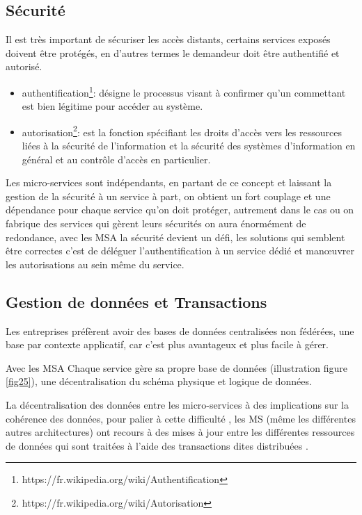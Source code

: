 \documentclass[12pt, a4paper, openany]{report}
\begin{document}
  \subsection{Sécurité}
  Il est très important de sécuriser les accès distants, certains services exposés doivent être protégés, en d’autres termes le demandeur doit être authentifié et autorisé.
  \begin{itemize}
      \item authentification\footnote{https://fr.wikipedia.org/wiki/Authentification}: désigne le processus visant à confirmer qu'un commettant est bien légitime pour accéder au système.
      \item autorisation\footnote{https://fr.wikipedia.org/wiki/Autorisation}: est la fonction spécifiant les droits d'accès vers les ressources liées à la sécurité de l'information et la sécurité des systèmes d'information en général et au contrôle d'accès en particulier.
  \end{itemize}
  Les micro-services sont indépendants, en partant de ce concept et laissant la gestion de la sécurité à un service à part, on obtient un fort couplage et une dépendance pour chaque service qu’on doit protéger, autrement dans le cas ou on fabrique des services qui gèrent leurs sécurités on aura énormément de redondance, avec les MSA la sécurité devient un défi, les solutions qui semblent être correctes c’est de déléguer l’authentification à un service dédié et manœuvrer les autorisations au sein même du service.
  
  \subsection{Gestion de données et Transactions}
  Les entreprises préfèrent avoir des bases de données centralisées non fédérées, une base par contexte applicatif, car c’est plus avantageux et plus facile à gérer.

  Avec les MSA Chaque service gère sa propre base de données (illustration figure \ref{fig25}), une décentralisation du schéma physique et logique de données.

  La décentralisation des données entre les micro-services à des implications sur la cohérence des données,  pour palier à cette difficulté , les MS (même les différentes autres architectures) ont recours à des mises à jour entre les différentes ressources de données  qui sont traitées à l’aide des transactions dites distribuées \cite{refbibFowler}.  \\
  
\end{document}
